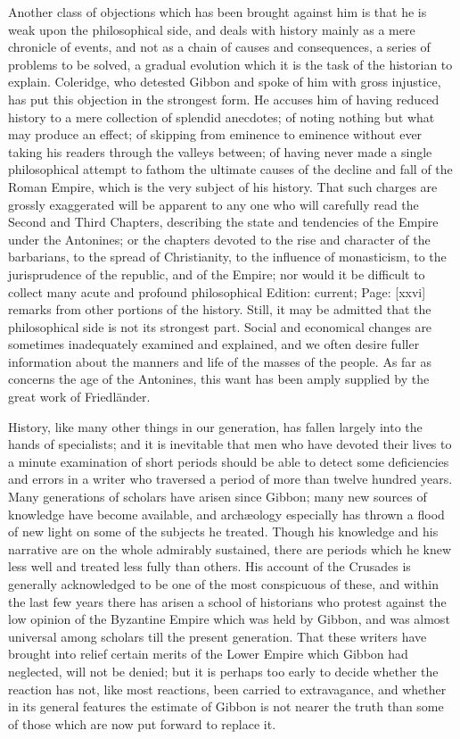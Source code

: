 Another class of objections which has been brought against him is that he is weak upon the philosophical side, and deals with history mainly as a mere chronicle of events, and not as a chain of causes and consequences, a series of problems to be solved, a gradual evolution which it is the task of the historian to explain. Coleridge, who detested Gibbon and spoke of him with gross injustice, has put this objection in the strongest form. He accuses him of having reduced history to a mere collection of splendid anecdotes; of noting nothing but what may produce an effect; of skipping from eminence to eminence without ever taking his readers through the valleys between; of having never made a single philosophical attempt to fathom the ultimate causes of the decline and fall of the Roman Empire, which is the very subject of his history. That such charges are grossly exaggerated will be apparent to any one who will carefully read the Second and Third Chapters, describing the state and tendencies of the Empire under the Antonines; or the chapters devoted to the rise and character of the barbarians, to the spread of Christianity, to the influence of monasticism, to the jurisprudence of the republic, and of the Empire; nor would it be difficult to collect many acute and profound philosophical Edition: current; Page: [xxvi] remarks from other portions of the history. Still, it may be admitted that the philosophical side is not its strongest part. Social and economical changes are sometimes inadequately examined and explained, and we often desire fuller information about the manners and life of the masses of the people. As far as concerns the age of the Antonines, this want has been amply supplied by the great work of Friedländer.

History, like many other things in our generation, has fallen largely into the hands of specialists; and it is inevitable that men who have devoted their lives to a minute examination of short periods should be able to detect some deficiencies and errors in a writer who traversed a period of more than twelve hundred years. Many generations of scholars have arisen since Gibbon; many new sources of knowledge have become available, and archæology especially has thrown a flood of new light on some of the subjects he treated. Though his knowledge and his narrative are on the whole admirably sustained, there are periods which he knew less well and treated less fully than others. His account of the Crusades is generally acknowledged to be one of the most conspicuous of these, and within the last few years there has arisen a school of historians who protest against the low opinion of the Byzantine Empire which was held by Gibbon, and was almost universal among scholars till the present generation. That these writers have brought into relief certain merits of the Lower Empire which Gibbon had neglected, will not be denied; but it is perhaps too early to decide whether the reaction has not, like most reactions, been carried to extravagance, and whether in its general features the estimate of Gibbon is not nearer the truth than some of those which are now put forward to replace it.

